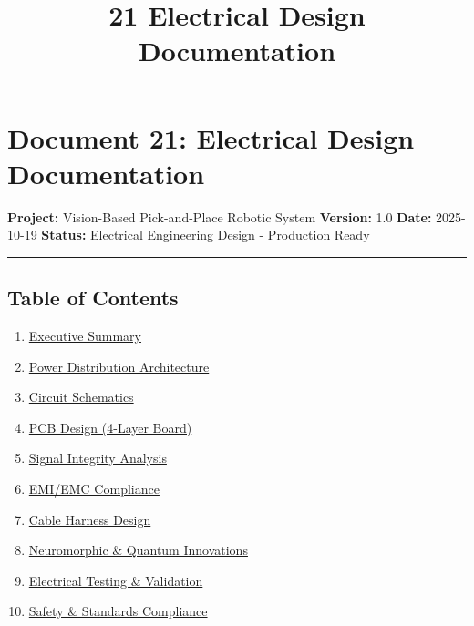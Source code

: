 \documentclass[
]{article}
\title{21 Electrical Design Documentation}
\author{}
\date{}
\providecommand{\tightlist}{%
  \setlength{\itemsep}{0pt}\setlength{\parskip}{0pt}}
\begin{document}
\maketitle

{
\setcounter{tocdepth}{3}
\tableofcontents
}
\hypertarget{document-21-electrical-design-documentation}{%
\section{Document 21: Electrical Design
Documentation}\label{document-21-electrical-design-documentation}}

\textbf{Project:} Vision-Based Pick-and-Place Robotic System
\textbf{Version:} 1.0 \textbf{Date:} 2025-10-19 \textbf{Status:}
Electrical Engineering Design - Production Ready

\begin{center}\rule{0.5\linewidth}{0.5pt}\end{center}

\hypertarget{table-of-contents}{%
\subsection{Table of Contents}\label{table-of-contents}}

\begin{enumerate}
\def\labelenumi{\arabic{enumi}.}
\tightlist
\item
  \protect\hyperlink{1-executive-summary}{Executive Summary}
\item
  \protect\hyperlink{2-power-distribution-architecture}{Power
  Distribution Architecture}
\item
  \protect\hyperlink{3-circuit-schematics}{Circuit Schematics}
\item
  \protect\hyperlink{4-pcb-design-4-layer-board}{PCB Design (4-Layer
  Board)}
\item
  \protect\hyperlink{5-signal-integrity-analysis}{Signal Integrity
  Analysis}
\item
  \protect\hyperlink{6-emiemc-compliance}{EMI/EMC Compliance}
\item
  \protect\hyperlink{7-cable-harness-design}{Cable Harness Design}
\item
  \protect\hyperlink{8-neuromorphic--quantum-innovations}{Neuromorphic
  \& Quantum Innovations}
\item
  \protect\hyperlink{9-electrical-testing--validation}{Electrical
  Testing \& Validation}
\item
  \protect\hyperlink{10-safety--standards-compliance}{Safety \&
  Standards Compliance}
\end{enumerate}
\end{document}

